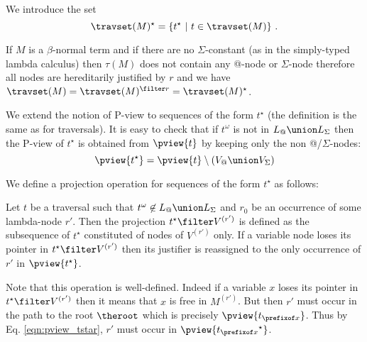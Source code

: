 We introduce the set
$$\travset(M)^\star = \{ t^\star \ | \  t \in \travset(M) \} \ .$$

\begin{remark}
If $M$ is a $\beta$-normal term and if there are no
$\Sigma$-constant (as in the simply-typed lambda calculus) then
$\tau(M)$ does not contain any @-node or $\Sigma$-node therefore all
nodes are hereditarily justified by $r$ and we have $\travset(M) =
\travset(M)^{\filter r} = \travset(M)^\star$.
\end{remark}


We extend the notion of P-view to sequences of the form $t^\star$
(the definition is the same as for traversals). It is easy to check
that if $t^\omega$ is not in $L_@ \union L_\Sigma$ then the P-view
of $t^\star$ is obtained from $\pview{t}$ by keeping only the non
@/$\Sigma$-nodes:
\begin{equation}
 \pview{t^\star} = \pview{t} \setminus (V_@ \union V_\Sigma) \label{eqn:pview_tstar}
\end{equation}

We define a projection operation for sequences of the form $t^\star$
as follows:
\begin{definition}
\label{def:subterm_trav_projection}
  Let $t$ be a traversal such that $t^\omega\not\in L_@ \union L_\Sigma$ and $r_0$ be an occurrence of some
lambda-node $r'$. Then the projection $t^\star \filter V^{(r')}$ is
defined as the subsequence of $t^\star$ constituted of nodes of
$V^{(r')}$ only. If a variable node loses its pointer in $t^\star
\filter V^{(r')}$ then its justifier is reassigned to the only
occurrence of $r'$ in $\pview{t^\star}$.
\end{definition}
Note that this operation is well-defined. Indeed if a variable $x$
loses its pointer in $t^\star \filter V^{(r')}$ then it means that
$x$ is free in $M^{(r')}$. But then $r'$ must occur in the path to
the root $\theroot$ which is precisely $\pview{t_{\prefixof x}}$.
Thus by Eq. \ref{eqn:pview_tstar}, $r'$ must occur in
$\pview{{t_{\prefixof x}}^\star}$.



